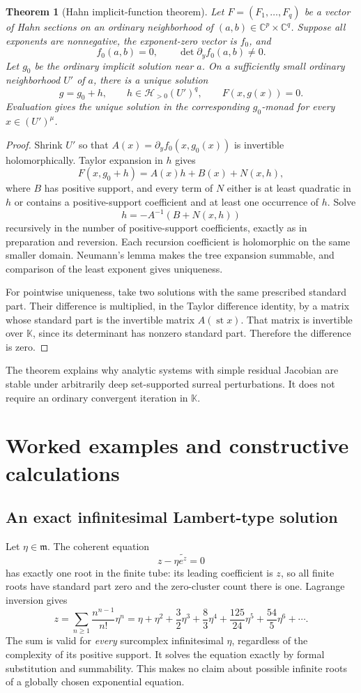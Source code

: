\documentclass[11pt,oneside]{article}
\numberwithin{equation}{section}
\newtheorem{theorem}{Theorem}[section]
\theoremstyle{definition}
\theoremstyle{remark}\newtheorem{remark}[theorem]{Remark}
\newcommand{\K}{\mathbb K}
\newcommand{\C}{\mathbb C}
\newcommand{\HH}{\mathscr H}
\newcommand{\m}{\mathfrak m}
\newcommand{\st}{\operatorname{st}}
\begin{document}
\begin{theorem}[Hahn implicit-function theorem]\label{thm:implicit}
Let $F=(F_1,\ldots,F_q)$ be a vector of Hahn sections on an ordinary
neighborhood of $(a,b)\in\C^p\times\C^q$. Suppose all exponents are
nonnegative, the exponent-zero vector is $f_0$, and
\[
 f_0(a,b)=0,\qquad \det\partial_y f_0(a,b)\ne0.
\]
Let $g_0$ be the ordinary implicit solution near $a$. On a sufficiently
small ordinary neighborhood $U'$ of $a$, there is a unique solution
\[
 g=g_0+h,\qquad h\in\HH_{>0}(U')^q,
 \qquad F(x,g(x))=0.
\]
Evaluation gives the unique solution in the corresponding $g_0$-monad
for every $x\in(U')^\mu$.
\end{theorem}
\begin{proof}
Shrink $U'$ so that $A(x)=\partial_y f_0(x,g_0(x))$ is invertible
holomorphically. Taylor expansion in $h$ gives
\[
 F(x,g_0+h)=A(x)h+B(x)+N(x,h),
\]
where $B$ has positive support, and every term of $N$ either is at least
quadratic in $h$ or contains a positive-support coefficient and at least
one occurrence of $h$. Solve
\[
 h=-A^{-1}(B+N(x,h))
\]
recursively in the number of positive-support coefficients, exactly as
in preparation and reversion. Each recursion coefficient is holomorphic
on the same smaller domain. Neumann's lemma makes the tree expansion
summable, and comparison of the least exponent gives uniqueness.

For pointwise uniqueness, take two solutions with the same prescribed
standard part. Their difference is multiplied, in the Taylor difference
identity, by a matrix whose standard part is the invertible matrix
$A(\st x)$. That matrix is invertible over $\K$, since its determinant
has nonzero standard part. Therefore the difference is zero.
\end{proof}
The theorem explains why analytic systems with simple residual Jacobian
are stable under arbitrarily deep set-supported surreal perturbations.
It does not require an ordinary convergent iteration in $\K$.

\section{Worked examples and constructive calculations}
\subsection{An exact infinitesimal Lambert-type solution}
Let $\eta\in\m$. The coherent equation
\[
 z-\eta\widetilde{e^z}=0
\]
has exactly one root in the finite tube: its leading coefficient is $z$,
so all finite roots have standard part zero and the zero-cluster count
there is one. Lagrange inversion gives
\begin{equation}\label{eq:tree}
 z=\sum_{n\geq1}\frac{n^{n-1}}{n!}\eta^n
 =\eta+\eta^2+\frac32\eta^3+\frac83\eta^4
     +\frac{125}{24}\eta^5+\frac{54}{5}\eta^6+\cdots.
\end{equation}
The sum is valid for \emph{every} surcomplex infinitesimal $\eta$, regardless
of the complexity of its positive support. It solves the equation
exactly by formal substitution and summability. This makes no claim about
possible infinite roots of a globally chosen exponential equation.
\end{document}
